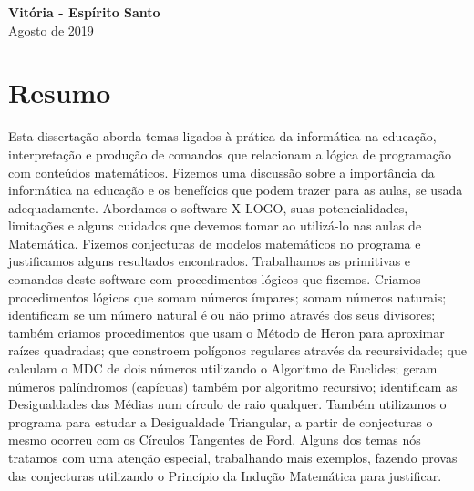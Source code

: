 \documentclass[12pt, a4paper,oneside]{book}
\begin{document}
\vspace{4cm}


\begin{center}
\textbf{Vitória - Espírito Santo} \\
Agosto de 2019
\end{center}















\pagestyle{myheadings} %
\newpage
\thispagestyle{empty}
\chapter*{Resumo}




Esta dissertação aborda temas ligados à prática da informática na educação, interpretação e produção de comandos que relacionam a lógica de programação com conteúdos matemáticos. Fizemos uma discussão sobre a importância da informática na educação e os benefícios que podem trazer para as aulas, se usada adequadamente. Abordamos o software X-LOGO, suas potencialidades, limitações e alguns cuidados que devemos tomar ao utilizá-lo nas aulas de Matemática. Fizemos conjecturas de modelos matemáticos no programa e justificamos alguns resultados encontrados. Trabalhamos as primitivas e comandos deste software com procedimentos lógicos que fizemos. Criamos procedimentos lógicos que somam números ímpares; somam números naturais;  identificam se um número natural é ou não primo através dos seus divisores; também criamos procedimentos que usam o Método de Heron para aproximar raízes quadradas; que constroem polígonos regulares através da recursividade; que calculam o MDC de dois números utilizando o Algoritmo de Euclides; geram números palíndromos (capícuas) também por algoritmo recursivo; identificam as Desigualdades das Médias num círculo de raio qualquer. Também utilizamos o programa para estudar a Desigualdade Triangular, a partir de conjecturas o mesmo ocorreu com os Círculos Tangentes de Ford. Alguns dos temas nós tratamos com uma atenção especial, trabalhando mais exemplos, fazendo provas das conjecturas utilizando o Princípio da Indução Matemática para justificar. 
 
\end{document}
